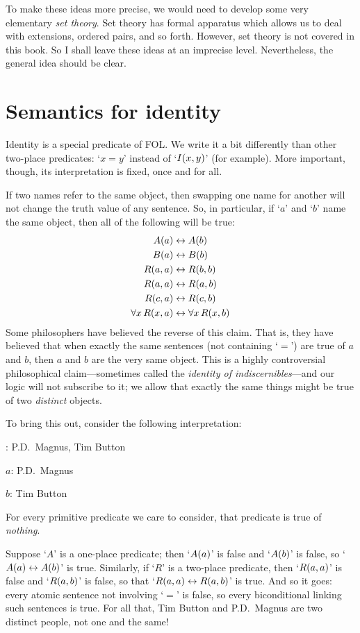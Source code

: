 To make these ideas more precise, we would need to develop some very elementary \emph{set theory}. Set theory has formal apparatus which allows us to deal with extensions, ordered pairs, and so forth. However, set theory is not covered in this book. So I shall leave these ideas at an imprecise level. Nevertheless, the general idea should be clear.


\section{Semantics for identity}
Identity is a special predicate of FOL. We write it a bit differently than other two-place predicates: `$x=y$' instead of `$\mathord{I}(x,y)$' (for example). More important, though, its interpretation is fixed, once and for all. 

If two names refer to the same object, then swapping one name for another will not change the truth value of any sentence. So, in particular, if `$a$' and `$b$' name the same object, then all of the following will be true:\label{model.nonidentity}
	\begin{align*}
	 	\mathord{A}(a) &\leftrightarrow \mathord{A}(b) \\
	 	\mathord{B}(a) &\leftrightarrow \mathord{B}(b)\\
		\mathord{R}(a,a) &\leftrightarrow \mathord{R}(b,b)\\
		\mathord{R}(a,a) & \leftrightarrow \mathord{R}(a,b)\\
		\mathord{R}(c,a) &\leftrightarrow \mathord{R}(c,b)\\
		\forall x\, \mathord{R}(x,a) &\leftrightarrow \forall x\, \mathord{R}(x,b)
	\end{align*}
Some philosophers have believed the reverse of this claim. That is, they have believed that when exactly the same sentences (not containing `$=$') are true of $a$ and $b$, then $a$ and $b$ are the very same object. This is a highly controversial philosophical claim---sometimes called the \emph{identity of indiscernibles}---and our logic will not subscribe to it; we allow that exactly the same things might be true of two \emph{distinct} objects.  

To bring this out, consider the following interpretation:
	\begin{ebullet}
		\item[\text{domain}:] P.D.\ Magnus, Tim Button
		\item[$a$:] P.D.\ Magnus
		\item[$b$:] Tim Button
		\item For every primitive predicate we care to consider, that predicate is true of \emph{nothing}.
	\end{ebullet}
Suppose `$A$' is a one-place predicate; then `$\mathord{A}(a)$' is false and `$\mathord{A}(b)$' is false, so `$\mathord{A}(a) \leftrightarrow \mathord{A}(b)$' is true. Similarly, if `$R$' is a two-place predicate, then `$\mathord{R}(a,a)$' is false and `$\mathord{R}(a,b)$' is false, so that `$\mathord{R}(a,a) \leftrightarrow \mathord{R}(a,b)$' is true. And so it goes: every atomic sentence not involving `$=$' is false, so every biconditional linking such sentences is true. For all that, Tim Button and P.D.\ Magnus are two distinct people, not one and the same!

